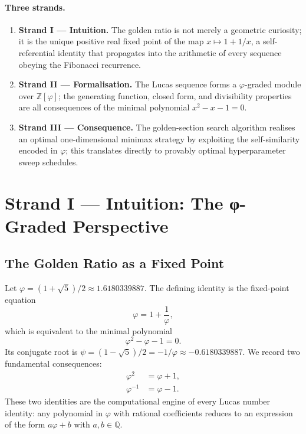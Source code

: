 \paragraph{Three strands.}
\begin{enumerate}
  \item \textbf{Strand I — Intuition.}
        The golden ratio is not merely a geometric curiosity;
        it is the unique positive real fixed point of the map
        \(x \mapsto 1 + 1/x\), a self-referential identity that
        propagates into the arithmetic of every sequence obeying
        the Fibonacci recurrence.
  \item \textbf{Strand II — Formalisation.}
        The Lucas sequence forms a \(\varphi\)-graded module over
        \(\mathbb{Z}[\varphi]\); the generating function, closed
        form, and divisibility properties are all consequences of
        the minimal polynomial \(x^2 - x - 1 = 0\).
  \item \textbf{Strand III — Consequence.}
        The golden-section search algorithm realises an
        optimal one-dimensional minimax strategy by exploiting
        the self-similarity encoded in \(\varphi\); this translates
        directly to provably optimal hyperparameter sweep schedules.
\end{enumerate}

\section{Strand I — Intuition: The φ-Graded Perspective}
\label{sec:gh-strand1}

\subsection{The Golden Ratio as a Fixed Point}
\label{subsec:gh-fixedpoint}

Let \(\varphi = (1+\sqrt{5})/2 \approx 1.6180339887\).
The defining identity is the fixed-point equation
\begin{equation}\label{eq:gh-fp}
  \varphi = 1 + \frac{1}{\varphi},
\end{equation}
which is equivalent to the minimal polynomial
\begin{equation}\label{eq:gh-minpoly}
  \varphi^2 - \varphi - 1 = 0.
\end{equation}
Its conjugate root is \(\psi = (1-\sqrt{5})/2 = -1/\varphi \approx -0.6180339887\).
We record two fundamental consequences:
\begin{align}
  \varphi^2 &= \varphi + 1, \label{eq:gh-phi2} \\
  \varphi^{-1} &= \varphi - 1. \label{eq:gh-phiinv}
\end{align}
These two identities are the computational engine of every Lucas number
identity: any polynomial in \(\varphi\) with rational coefficients
reduces to an expression of the form \(a\varphi + b\) with
\(a, b \in \mathbb{Q}\).

